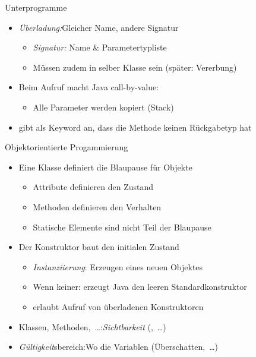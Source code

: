 {\begin{frame}[c]{Unterprogramme}
\begin{itemize}[<+(1)->]
   \itemsep18pt
   \item \textit{Überladung:}\quad\pause Gleicher Name, andere Signatur \begin{itemize}
      \item \textit{Signatur:} \pause Name \& Parametertypliste
      \item Müssen zudem in selber Klasse sein (später: Vererbung)
   \end{itemize}
   \item Beim Aufruf macht Java call-by-value: \begin{itemize}
      \item Alle Parameter werden kopiert (Stack)
   \end{itemize}
   \item {} gibt als Keyword an, dass die Methode keinen Rückgabetyp hat
\end{itemize}
\end{frame}

\begin{frame}[c]{Objektorientierte Progammierung}
\begin{itemize}[<+(1)->]
   \itemsep15pt
   \item Eine Klasse definiert die Blaupause für Objekte \begin{itemize}
      \item Attribute definieren den Zustand
      \item Methoden definieren den Verhalten
      \item Statische Elemente sind nicht Teil der Blaupause 
   \end{itemize}
   \item Der Konstruktor baut den initialen Zustand \begin{itemize}
      \item \textit{Instanziierung}: \pause Erzeugen eines neuen Objektes
      \item Wenn keiner: \pause erzeugt Java den leeren Standardkonstruktor
      \item {} erlaubt Aufruf von überladenen Konstruktoren
   \end{itemize}
   \item Klassen, Methoden,~\ldots:\quad \textit{Sichtbarkeit} (,~\ldots)
   \item \textit{Gültigkeit}sbereich:\quad Wo die Variablen  (Überschatten,~\ldots)
\end{itemize}
\end{frame}
}\fi

